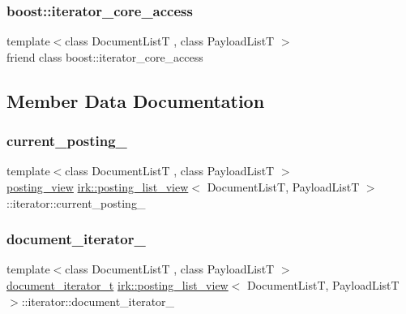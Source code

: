 \subsubsection{\texorpdfstring{boost\+::iterator\+\_\+core\+\_\+access}{boost::iterator\_core\_access}}
{\footnotesize\ttfamily template$<$class Document\+ListT , class Payload\+ListT $>$ \\
friend class boost\+::iterator\+\_\+core\+\_\+access\hspace{0.3cm}{\ttfamily [friend]}}



\subsection{Member Data Documentation}
\mbox{\label{classirk_1_1posting__list__view_1_1iterator_a7b1b45868eb6aa3089dcae3fd1d9eded}} 
\subsubsection{\texorpdfstring{current\+\_\+posting\+\_\+}{current\_posting\_}}
{\footnotesize\ttfamily template$<$class Document\+ListT , class Payload\+ListT $>$ \\
\mbox{\hyperlink{classirk_1_1posting__list__view_1_1posting__view}{posting\+\_\+view}} \mbox{\hyperlink{classirk_1_1posting__list__view}{irk\+::posting\+\_\+list\+\_\+view}}$<$ Document\+ListT, Payload\+ListT $>$\+::iterator\+::current\+\_\+posting\+\_\+}

\mbox{\label{classirk_1_1posting__list__view_1_1iterator_ad3355c7b169d6a36092e394e78a7eba0}} 
\subsubsection{\texorpdfstring{document\+\_\+iterator\+\_\+}{document\_iterator\_}}
{\footnotesize\ttfamily template$<$class Document\+ListT , class Payload\+ListT $>$ \\
\mbox{\hyperlink{classirk_1_1posting__list__view_abaca622760e6da2c67d55cf35207250f}{document\+\_\+iterator\+\_\+t}} \mbox{\hyperlink{classirk_1_1posting__list__view}{irk\+::posting\+\_\+list\+\_\+view}}$<$ Document\+ListT, Payload\+ListT $>$\+::iterator\+::document\+\_\+iterator\+\_\+}

